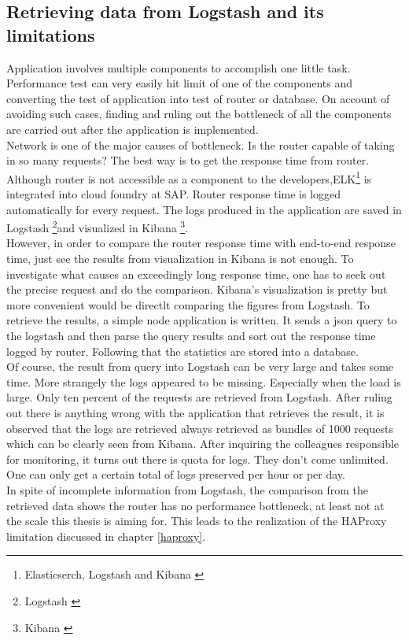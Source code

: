 \subsection{Retrieving data from Logstash and its limitations}
Application involves multiple components to accomplish one little task. Performance test can very easily hit limit of one of the components and converting the test of application into test of router or database. On account of avoiding such cases, finding and ruling out the bottleneck of all the components are carried out after the application is implemented. \\
Network is one of the major causes of bottleneck. Is the router capable of taking in so many requests? The best way is to get the response time from router. Although router is not accessible as a component to the developers,\ac{ELK}\footnote{Elasticserch, Logstash and Kibana \citep{ELK}} is integrated into cloud foundry at SAP. Router response time is logged automatically for every request. The logs produced in the application are saved in Logstash \footnote{Logstash \citep{Logstash}}and visualized in Kibana \footnote{Kibana \citep{Kibana}}. \\ 
However, in order to compare the router response time with end-to-end response time, just see the results from visualization in Kibana is not enough. To investigate what causes an exceedingly long response time, one has to seek out the precise request and do the comparison. Kibana's visualization is pretty but more convenient would be directlt comparing the figures from Logstash. To retrieve the results, a simple node application is written. It sends a json query to the logstash and then parse the query results and sort out the response time logged by router. Following that the statistics are stored into a database.\\
Of course, the result from query into Logstash can be very large and takes some time. More strangely the logs appeared to be missing. Especially when the load is large. Only ten percent of the requests are retrieved from Logstash. After ruling out there is anything wrong with the application that retrieves the result, it is observed that the logs are retrieved always retrieved as bundles of 1000 requests which can be clearly seen from Kibana. After inquiring the colleagues responsible for monitoring,  it turns out there is quota for logs. They don't come unlimited. One can only get a certain total of logs preserved per hour or per day.\\
In spite of incomplete information from Logstash, the comparison from the retrieved data shows the router has no performance bottleneck, at least not at the scale this thesis is aiming for. This leads to the realization of the HAProxy limitation discussed in chapter \ref{haproxy}. 

